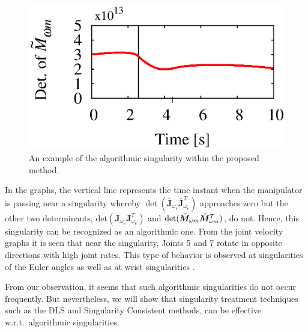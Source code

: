 \begin{figure}[t]
\begin{minipage}[t]{0.40\linewidth}
  \end{minipage}
  \begin{minipage}[t]{0.40\linewidth}
    \centering
    \includegraphics[width=1.0\linewidth]{fig/chapter4/inspection/singularity/SAMPLE/U15_determinant_Mwm.eps}
  \end{minipage}
  \caption{An example of the algorithmic singularity within the proposed method.}
  \label{fig:RES_SIN}
\end{figure}
%
In the graphs, the vertical line represents the time instant when
the manipulator is passing  near a singularity whereby
$\det(\bar{\bm{J}}_{\omega_{e}}\bar{\bm{J}}_{\omega_{e}}^{T})$ approaches zero but the other two 
determinants,  $\mathrm{det}(\bm{J}_{\omega_{e}}\bm{J}_{\omega_{e}}^{T})$ and
$\mathrm{det}({\tilde{\bm{M}}}_{\omega m}{\tilde{\bm{M}}}_{\omega m}^{T})$, do not. %
Hence, this singularity can be recognized as an algorithmic one.
From the joint velocity graphs it is seen that near the singularity, 
Joints 5 and 7 rotate in opposite directions with high  joint rates.
This type of behavior is observed at singularities of the Euler angles \cite{Taki2013}
as well as at wrist singularities \cite{Aboaf1987}.

From our observation, it seems that such algorithmic  singularities do not occur frequently.
But nevertheless, we will show that singularity treatment techniques such as  the DLS and 
Singularity Consistent methods, can be effective w.r.t.\ algorithmic singularities.

